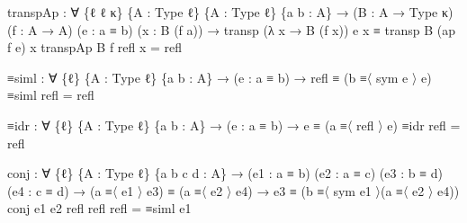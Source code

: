 \documentclass[
  11pt,
  oneside,
  article]{memoir}
\newenvironment{Shaded}{}{}
\newcommand{\NormalTok}[1]{#1}
\newcommand{\OtherTok}[1]{\textcolor[rgb]{0.00,0.44,0.13}{#1}}
\theoremstyle{definition}
\theoremstyle{plain}
\newcommand{\0}{\textsf{0}}
\newcommand{\1}{\tn{\textsf{1}}}
\begin{document}
\begin{Shaded}
\begin{Highlighting}[]
\NormalTok{transpAp }\OtherTok{:} \OtherTok{∀} \OtherTok{\{}\NormalTok{ℓ ℓ\textquotesingle{} κ}\OtherTok{\}} \OtherTok{\{}\NormalTok{A }\OtherTok{:}\NormalTok{ Type ℓ}\OtherTok{\}} \OtherTok{\{}\NormalTok{A\textquotesingle{} }\OtherTok{:}\NormalTok{ Type ℓ\textquotesingle{}}\OtherTok{\}} \OtherTok{\{}\NormalTok{a b }\OtherTok{:}\NormalTok{ A}\OtherTok{\}}
           \OtherTok{→} \OtherTok{(}\NormalTok{B }\OtherTok{:}\NormalTok{ A\textquotesingle{} }\OtherTok{→}\NormalTok{ Type κ}\OtherTok{)} \OtherTok{(}\NormalTok{f }\OtherTok{:}\NormalTok{ A }\OtherTok{→}\NormalTok{ A\textquotesingle{}}\OtherTok{)} \OtherTok{(}\NormalTok{e }\OtherTok{:}\NormalTok{ a ≡ b}\OtherTok{)} \OtherTok{(}\NormalTok{x }\OtherTok{:}\NormalTok{ B }\OtherTok{(}\NormalTok{f a}\OtherTok{))}
           \OtherTok{→}\NormalTok{ transp }\OtherTok{(λ}\NormalTok{ x }\OtherTok{→}\NormalTok{ B }\OtherTok{(}\NormalTok{f x}\OtherTok{))}\NormalTok{ e x ≡ transp B }\OtherTok{(}\NormalTok{ap f e}\OtherTok{)}\NormalTok{ x}
\NormalTok{transpAp B f refl x }\OtherTok{=}\NormalTok{ refl}

\NormalTok{≡siml }\OtherTok{:} \OtherTok{∀} \OtherTok{\{}\NormalTok{ℓ}\OtherTok{\}} \OtherTok{\{}\NormalTok{A }\OtherTok{:}\NormalTok{ Type ℓ}\OtherTok{\}} \OtherTok{\{}\NormalTok{a b }\OtherTok{:}\NormalTok{ A}\OtherTok{\}}
        \OtherTok{→} \OtherTok{(}\NormalTok{e }\OtherTok{:}\NormalTok{ a ≡ b}\OtherTok{)} \OtherTok{→}\NormalTok{ refl ≡ }\OtherTok{(}\NormalTok{b ≡〈 sym e 〉 e}\OtherTok{)}
\NormalTok{≡siml refl }\OtherTok{=}\NormalTok{ refl}

\NormalTok{≡idr }\OtherTok{:} \OtherTok{∀} \OtherTok{\{}\NormalTok{ℓ}\OtherTok{\}} \OtherTok{\{}\NormalTok{A }\OtherTok{:}\NormalTok{ Type ℓ}\OtherTok{\}} \OtherTok{\{}\NormalTok{a b }\OtherTok{:}\NormalTok{ A}\OtherTok{\}}
       \OtherTok{→} \OtherTok{(}\NormalTok{e }\OtherTok{:}\NormalTok{ a ≡ b}\OtherTok{)} \OtherTok{→}\NormalTok{ e ≡ }\OtherTok{(}\NormalTok{a ≡〈 refl 〉 e}\OtherTok{)}
\NormalTok{≡idr refl }\OtherTok{=}\NormalTok{ refl}

\NormalTok{conj }\OtherTok{:} \OtherTok{∀} \OtherTok{\{}\NormalTok{ℓ}\OtherTok{\}} \OtherTok{\{}\NormalTok{A }\OtherTok{:}\NormalTok{ Type ℓ}\OtherTok{\}} \OtherTok{\{}\NormalTok{a b c d }\OtherTok{:}\NormalTok{ A}\OtherTok{\}}
       \OtherTok{→} \OtherTok{(}\NormalTok{e1 }\OtherTok{:}\NormalTok{ a ≡ b}\OtherTok{)} \OtherTok{(}\NormalTok{e2 }\OtherTok{:}\NormalTok{ a ≡ c}\OtherTok{)} \OtherTok{(}\NormalTok{e3 }\OtherTok{:}\NormalTok{ b ≡ d}\OtherTok{)} \OtherTok{(}\NormalTok{e4 }\OtherTok{:}\NormalTok{ c ≡ d}\OtherTok{)}
       \OtherTok{→} \OtherTok{(}\NormalTok{a ≡〈 e1 〉 e3}\OtherTok{)}\NormalTok{ ≡ }\OtherTok{(}\NormalTok{a ≡〈 e2 〉 e4}\OtherTok{)}
       \OtherTok{→}\NormalTok{ e3 ≡ }\OtherTok{(}\NormalTok{b ≡〈 sym e1 〉}\OtherTok{(}\NormalTok{a ≡〈 e2 〉 e4}\OtherTok{))}
\NormalTok{conj e1 e2 refl refl refl }\OtherTok{=}\NormalTok{ ≡siml e1}


\end{Highlighting}
\end{Shaded}
\end{document}
